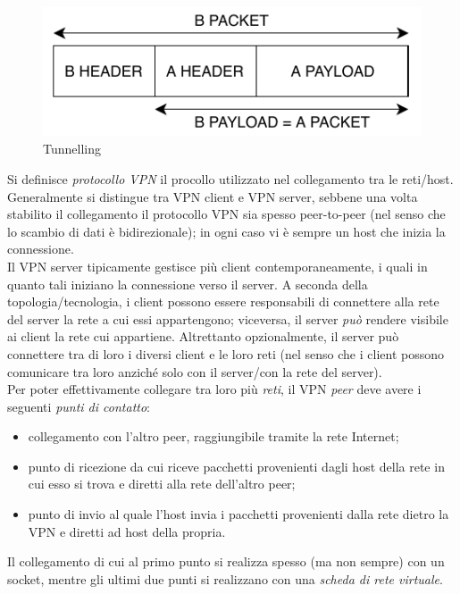 \begin{figure}
	\includegraphics[scale=0.7]{img/tunnelling}
	\caption{Tunnelling}
	\label{fig:tunnelling}
\end{figure}


Si definisce \textit{protocollo VPN}
il procollo utilizzato nel collegamento tra le reti/host.
Generalmente si distingue tra VPN client e VPN server, sebbene
una volta stabilito il collegamento il protocollo VPN sia spesso peer-to-peer
(nel senso che lo scambio di dati è bidirezionale);
in ogni caso vi è sempre un host che inizia la connessione.\\
Il VPN server tipicamente gestisce più client contemporaneamente, i quali in quanto tali
iniziano la connessione verso il server. A seconda della topologia/tecnologia,
i client possono essere responsabili di connettere alla rete del server la rete
a cui essi appartengono; viceversa, il server \textit{può} rendere visibile ai client
la rete cui appartiene. Altrettanto opzionalmente,
il server può connettere tra di loro i diversi client e le loro reti (nel senso che
i client possono comunicare tra loro anziché solo con il server/con la rete del server).\\
Per poter effettivamente collegare tra loro più \textit{reti}, il VPN \textit{peer}
deve avere i seguenti \textit{punti di contatto}:
\begin{itemize}
	\item collegamento con l'altro peer, raggiungibile tramite la rete Internet;
	\item punto di ricezione da cui riceve pacchetti provenienti dagli host della
	      rete in cui esso si trova e diretti alla rete dell'altro peer;
	\item punto di invio al quale l'host invia i pacchetti provenienti dalla rete dietro
	      la VPN
	      e diretti ad host della propria.
\end{itemize}
Il collegamento di cui al primo punto si realizza spesso (ma non sempre) con un socket,
mentre gli ultimi due punti si realizzano con una \textit{scheda di rete virtuale}.\\

